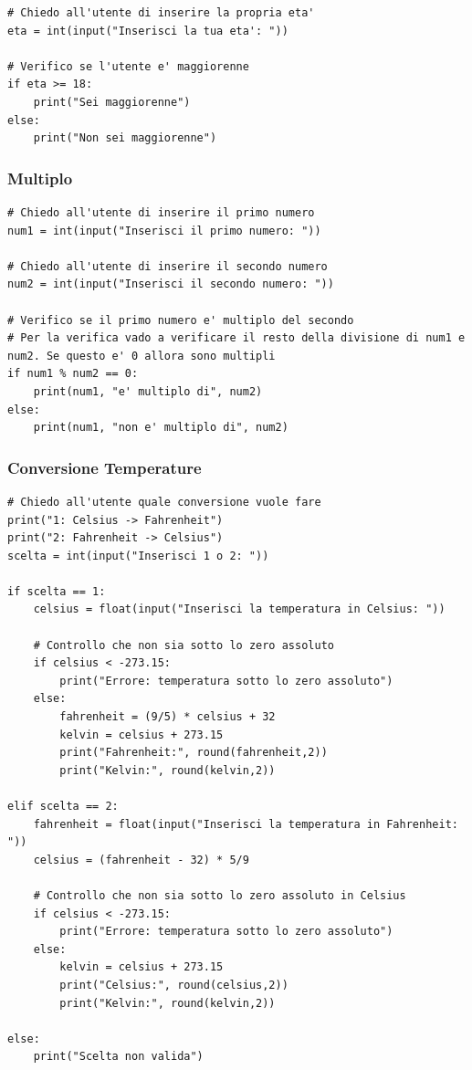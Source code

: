 \documentclass[a4paper,12pt]{article}
\begin{document}
\begin{lstlisting}
# Chiedo all'utente di inserire la propria eta'
eta = int(input("Inserisci la tua eta': "))

# Verifico se l'utente e' maggiorenne
if eta >= 18:
	print("Sei maggiorenne")
else:
	print("Non sei maggiorenne")
\end{lstlisting}


\newpage
\subsubsection{Multiplo}
\begin{lstlisting}
# Chiedo all'utente di inserire il primo numero
num1 = int(input("Inserisci il primo numero: "))

# Chiedo all'utente di inserire il secondo numero
num2 = int(input("Inserisci il secondo numero: "))

# Verifico se il primo numero e' multiplo del secondo
# Per la verifica vado a verificare il resto della divisione di num1 e num2. Se questo e' 0 allora sono multipli
if num1 % num2 == 0:
	print(num1, "e' multiplo di", num2)
else:
	print(num1, "non e' multiplo di", num2)
\end{lstlisting}

\newpage
\subsubsection{Conversione Temperature}

\begin{lstlisting}
# Chiedo all'utente quale conversione vuole fare
print("1: Celsius -> Fahrenheit")
print("2: Fahrenheit -> Celsius")
scelta = int(input("Inserisci 1 o 2: "))

if scelta == 1:
	celsius = float(input("Inserisci la temperatura in Celsius: "))

	# Controllo che non sia sotto lo zero assoluto
	if celsius < -273.15:
		print("Errore: temperatura sotto lo zero assoluto")
	else:
		fahrenheit = (9/5) * celsius + 32
		kelvin = celsius + 273.15
		print("Fahrenheit:", round(fahrenheit,2))
		print("Kelvin:", round(kelvin,2))

elif scelta == 2:
	fahrenheit = float(input("Inserisci la temperatura in Fahrenheit: "))
	celsius = (fahrenheit - 32) * 5/9

	# Controllo che non sia sotto lo zero assoluto in Celsius
	if celsius < -273.15:
		print("Errore: temperatura sotto lo zero assoluto")
	else:
		kelvin = celsius + 273.15
		print("Celsius:", round(celsius,2))
		print("Kelvin:", round(kelvin,2))

else:
	print("Scelta non valida")

\end{lstlisting}
\end{document}

